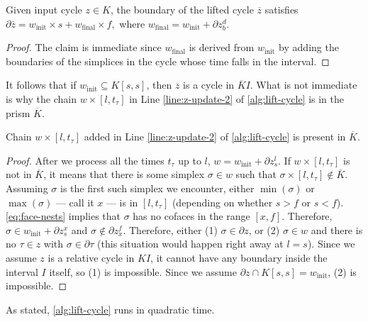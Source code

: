\documentclass[cleveref,a4paper,english,nolineno]{socg-lipics-v2021}
\newcommand{\prism}[1]{\overline{#1}}
\newcommand{\bdry}{\partial}
\newcommand{\pK}{\prism{K}}
\newcommand{\pz}{\prism{z}}
\newcommand{\ssx}{\sigma}
\newcommand{\tsx}{\tau}
\newcommand{\winit}{w_\textrm{init}}
\newcommand{\wfinal}{w_\textrm{final}}
\begin{document}
\begin{claim}
    \label{clm:lifted-boundary}
    Given input cycle $z \in K$, the boundary of the lifted cycle $\pz$ satisfies
    $
        \bdry \pz = \winit \times s + \wfinal \times f,
    $
    where
    $
        \wfinal = \winit + \bdry z_b^d.
    $
\end{claim}
\begin{proof}
    The claim is immediate since $\wfinal$ is derived from $\winit$ by adding
    the boundaries of the simplices in the cycle whose time falls in the interval.
\end{proof}
It follows that if $\winit \subseteq K[s,s]$, then $\pz$ is a cycle in $\pK I$.
What is not immediate is why the chain $w \times [l,t_\tsx]$ in
Line \ref{line:z-update-2} of \cref{alg:lift-cycle} is in the prism $\pK$.

\begin{claim}
    Chain $w \times [l, t_\tsx]$ added in Line \ref{line:z-update-2} of
    \cref{alg:lift-cycle} is present in $\pK$.
\end{claim}
\begin{proof}
    After we process all the times $t_\tsx$ up to $l$, $w =
    \winit + \bdry z_s^l$.
    If $w \times [l, t_\tsx]$ is not in $\pK$, it means that there is some
    simplex $\ssx \in w$ such that $\ssx \times [l, t_\tsx] \notin \pK$.
    Assuming $\ssx$ is the first such simplex we encounter, either $\min (\ssx)$
    or $\max (\ssx)$ --- call it $x$ --- is in $[l,t_\tsx]$ (depending on whether $s > f$ or $s < f$).
    \cref{eq:face-nests} implies that $\ssx$ has no cofaces in
    the range $[x,f]$. Therefore, $\ssx \in \winit + \bdry z_s^x$ and
    $\ssx \notin \bdry z_x^f$. Therefore, either (1) $\ssx \in \bdry z$,
    or (2) $\ssx \in w$ and there is no $\tsx \in z$ with $\ssx \in \bdry \tsx$
    (this situation would happen right away at $l=s$).
    Since we assume $z$ is a relative cycle in $KI$, it cannot have any boundary
    inside the interval $I$ itself, so (1) is impossible.
    Since we assume $\bdry z \cap K[s,s] = \winit$, (2) is impossible.
\end{proof}

As stated, \cref{alg:lift-cycle} runs in quadratic time.
\end{document}
